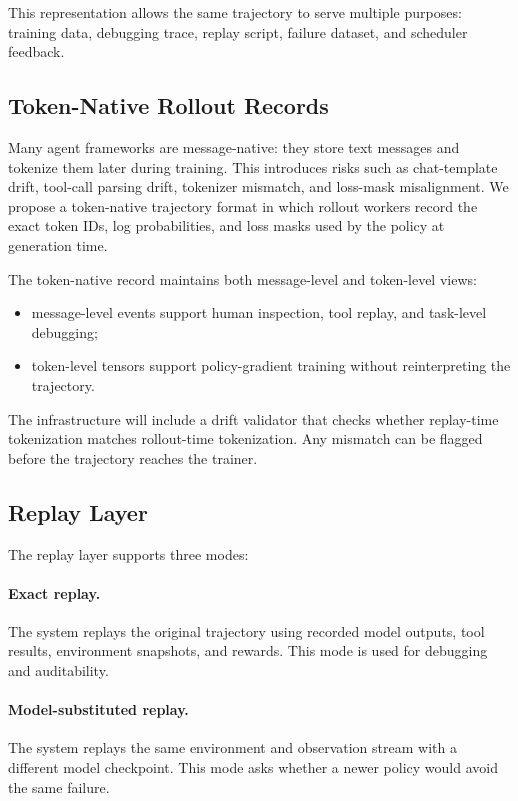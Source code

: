 \documentclass[11pt]{article}
\begin{document}
This representation allows the same trajectory to serve multiple purposes:
training data, debugging trace, replay script, failure dataset, and scheduler feedback.

\subsection{Token-Native Rollout Records}

Many agent frameworks are message-native: they store text messages and tokenize them later during training.
This introduces risks such as chat-template drift, tool-call parsing drift, tokenizer mismatch, and loss-mask misalignment.
We propose a token-native trajectory format in which rollout workers record the exact token IDs, log probabilities, and loss masks used by the policy at generation time.

The token-native record maintains both message-level and token-level views:

\begin{itemize}[leftmargin=*]
    \item message-level events support human inspection, tool replay, and task-level debugging;
    \item token-level tensors support policy-gradient training without reinterpreting the trajectory.
\end{itemize}

The infrastructure will include a drift validator that checks whether replay-time tokenization matches rollout-time tokenization.
Any mismatch can be flagged before the trajectory reaches the trainer.

\subsection{Replay Layer}

The replay layer supports three modes:

\paragraph{Exact replay.}
The system replays the original trajectory using recorded model outputs, tool results, environment snapshots, and rewards.
This mode is used for debugging and auditability.

\paragraph{Model-substituted replay.}
The system replays the same environment and observation stream with a different model checkpoint.
This mode asks whether a newer policy would avoid the same failure.
\end{document}
